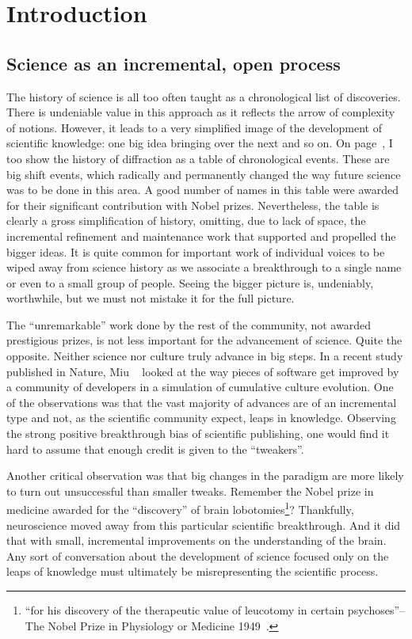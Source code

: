 \chapter{Introduction}

\section{Science as an incremental, open process}

The history of science is all too often taught as a chronological list of discoveries. There is undeniable value in this approach as it reflects the arrow of complexity of notions. However, it leads to a very simplified image of the development of scientific knowledge: one big idea bringing over the next and so on. On page~\pageref{table:historyDiff}, I too show the history of diffraction as a table of chronological events. These are big shift events, which radically and permanently changed the way future science was to be done in this area. A good number of names in this table were awarded for their significant contribution with Nobel prizes. Nevertheless, the table is clearly a gross simplification of history, omitting, due to lack of space, the incremental refinement and maintenance work that supported and propelled the bigger ideas. It is quite common for important work of individual voices to be wiped away from science history as we associate a breakthrough to a single name or even to a small group of people. Seeing the bigger picture is, undeniably, worthwhile, but we must not mistake it for the full picture.

The ``unremarkable'' work done by the rest of the community, not awarded prestigious prizes, is not less important for the advancement of science. Quite the opposite. Neither science nor culture truly advance in big steps. In a recent study published in Nature, Miu \etal~\cite{Miu2018} looked at the way pieces of software get improved by a community of developers in a simulation of cumulative culture evolution. One of the observations was that the vast majority of advances are of an incremental type and not, as the scientific community expect, leaps in knowledge. Observing the strong positive breakthrough bias of scientific publishing, one would find it hard to assume that enough credit is given to the ``tweakers''. 

Another critical observation was that big changes in the paradigm are more likely to turn out unsuccessful than smaller tweaks. Remember the Nobel prize in medicine awarded for the ``discovery'' of brain lobotomies\footnote{``for his discovery of the therapeutic value of leucotomy in certain psychoses''-- The Nobel Prize in Physiology or Medicine 1949~\cite{Nobel49}.}? Thankfully, neuroscience moved away from this particular scientific breakthrough. And it did that with small, incremental improvements on the understanding of the brain. Any sort of conversation about the development of science focused only on the leaps of knowledge must ultimately be misrepresenting the scientific process.


